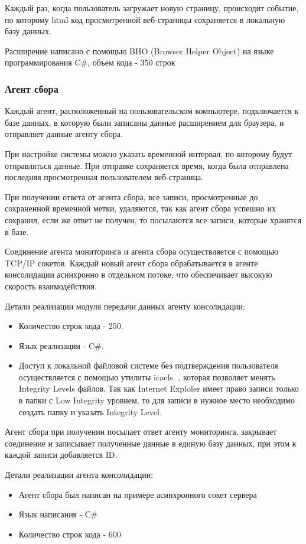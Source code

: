 \documentclass[russian, utf8, emptystyle]{eskdtext}
\begin{document}
Каждый раз, когда пользователь загружает новую страницу, происходит событие, по которому html код просмотренной веб-страницы сохраняется в локальную базу данных.

Расширение написано с помощью BHO (Browser Helper Object) на языке программирования C\#, объем кода - 350 строк
\subsubsection{Агент сбора}

Каждый агент, расположенный на пользовательском компьютере, подключается к базе данных, в которую были записаны данные расширением для браузера, и отправляет данные агенту сбора.

При настройке системы можно указать временной интервал, по которому будут отправляться данные. При отправке сохраняется время, когда была отправлена последняя просмотренная пользователем веб-страница.

При получении ответа от агента сбора, все записи, просмотренные до сохраненной временной метки, удаляются, так как агент сбора успешно их сохранил, если же ответ не получен, то посылаются все записи, которые хранятся в базе.

Соединение агента мониторинга и агента сбора осуществляется с помощью TCP/IP сокетов. Каждый новый агент сбора обрабатывается в агенте консолидации асинхронно в отдельном потоке, что обеспечивает высокую скорость взаимодействия.

Детали реализации модуля передачи данных агенту консолидации:
\begin{itemize}
	\item Количество строк кода - 250.
	\item Язык реализации - C\#.
	\item Доступ к локальной файловой системе без подтверждения пользователя осуществляется с помощью утилиты icacls. \cite{icacls}, которая позволяет менять Integrity Levels \cite{icacls} файлов. Так как Internet Exploler имеет право записи только в папки с Low Integrity уровнем, то для записи в нужное место необходимо создать папку и указать Integrity Level. 
\end{itemize}

Агент сбора при получении посылает ответ агенту мониторинга, закрывает соединение и записывает полученные данные в единую базу данных, при этом к каждой записи добавляется ID.

Детали реализации агента консолидации:
\begin{itemize}
	\item Агент сбора был написан на примере асинхронного сокет сервера \cite{msdn}
	\item Язык написания - С\#
	\item Количество строк кода - 600
\end{itemize}
\end{document}
